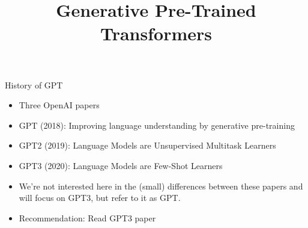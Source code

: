 



\newcommand{\titlefigure}{figure/73-gpt3.jpg}

\newcommand{\learninggoals}{
\item Understand biases inherent to GPT
\item Get a feeling for the cost and environmental impact}

\def\myblue#1{\textcolor{texblue}{#1}}

\title{Generative Pre-Trained Transformers}
\date{}




\begin{frame}{History of GPT}

\vfill

\begin{itemize}
\item Three OpenAI papers
\item GPT (2018): Improving language understanding by
generative pre-training
\item GPT2 (2019): Language Models are Unsupervised Multitask Learners
\item GPT3 (2020): Language Models are Few-Shot Learners 
\item We're not interested here in the (small) differences
between these papers and will focus on GPT3, but refer to it
as GPT.
\item Recommendation: Read GPT3 paper

    \end{itemize}

\vfill

\end{frame}


